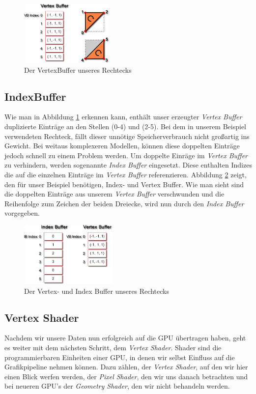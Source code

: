 \begin{Spacing}{\mylinespace}
\begin{figure}[h!]
	\vspace*{15px}
	\centering
	\includegraphics[height=120px]{graphics/vertexbuffer2.png}	
	\caption{Der VertexBuffer unseres Rechtecks}
	\label{fig:VertexBuffer}
\end{figure}

\subsection{IndexBuffer}
Wie man in Abbildung \ref{fig:VertexBuffer} erkennen kann, enthält unser erzeugter \textit{Vertex Buffer} duplizierte Einträge an den Stellen (0-4) und (2-5). Bei dem in unserem Beispiel verwendeten Rechteck, fällt dieser unnötige Speicherverbrauch nicht großartig ins Gewicht. Bei weitaus komplexeren Modellen, können diese doppelten Einträge jedoch schnell zu einem Problem werden. Um doppelte Einräge im \textit{Vertex Buffer} zu verhindern, werden sogenannte \textit{Index Buffer} eingesetzt. Diese enthalten Indizes die auf die einzelnen Einträge im \textit{Vertex Buffer} referenzieren. Abbildung \ref{fig:IndexBuffer} zeigt, den für unser Beispiel benötigen, Index- und Vertex Buffer. Wie man sieht sind die doppelten Einträge aus unserem \textit{Vertex Buffer} verschwunden und die Reihenfolge zum Zeichen der beiden Dreiecke, wird nun durch den \textit{Index Buffer} vorgegeben. 
 

\begin{figure}[h!]
	\vspace*{15px}
	\centering
	\includegraphics[height=120px]{graphics/indexbuffer2.png}	
	\caption{Der Vertex- und Index Buffer unseres Rechtecks}
	\label{fig:IndexBuffer}
\end{figure}

\subsection{Vertex Shader}
Nachdem wir unsere Daten nun erfolgreich auf die GPU übertragen haben, geht es weiter mit dem nächsten Schritt, dem \textit{Vertex Shader}. Shader sind die programmierbaren Einheiten einer GPU, in denen wir selbst Einfluss auf die Grafikpipeline nehmen können. Dazu zählen, der \textit{Vertex Shader}, auf den wir hier einen Blick werfen werden, der \textit{Pixel Shader}, den wir uns danach betrachten und bei neueren GPU's der \textit{Geometry Shader}, den wir nicht behandeln werden.
\\\\


\end{Spacing}
